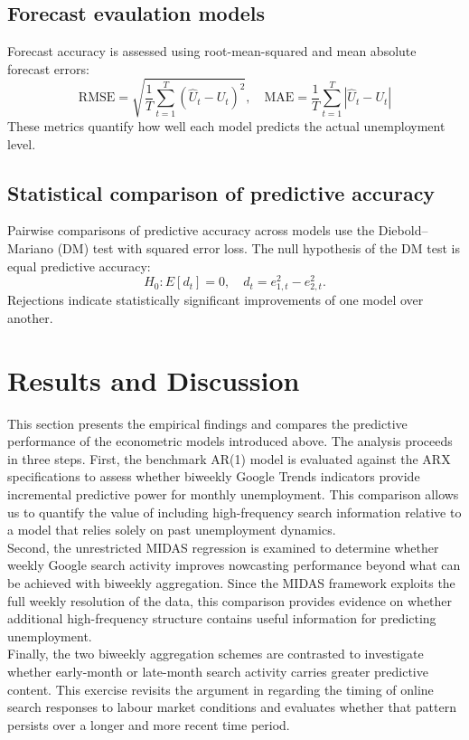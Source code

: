 \documentclass[12pt,a4paper]{article}
\begin{document}
\subsection{Forecast evaulation models}
Forecast accuracy is assessed using root-mean-squared and mean absolute forecast errors:
\begin{equation}
    \text{RMSE} = \sqrt{\frac{1}{T} \sum_{t=1}^{T} (\hat{U}_t - U_t)^2}, \quad 
    \text{MAE} = \frac{1}{T} \sum_{t=1}^{T} |\hat{U}_t - U_t|
\end{equation}
These metrics quantify how well each model predicts the actual unemployment level.
\subsection{Statistical comparison of predictive accuracy}
Pairwise comparisons of predictive accuracy across models use the Diebold–Mariano (DM) test with squared error loss. The null hypothesis of the DM test is equal predictive accuracy:
\begin{equation}
    H_0: E[d_t] = 0, \quad d_t = e_{1,t}^2 - e_{2,t}^2.
\end{equation}
Rejections indicate statistically significant improvements of one model over another.

\section{Results and Discussion}
This section presents the empirical findings and compares the predictive
performance of the econometric models introduced above. The analysis proceeds in
three steps. First, the benchmark AR(1) model is evaluated against the ARX
specifications to assess whether biweekly Google Trends indicators provide
incremental predictive power for monthly unemployment. This comparison allows us
to quantify the value of including high-frequency search information relative to
a model that relies solely on past unemployment dynamics.\\
Second, the unrestricted MIDAS regression is examined to determine whether weekly
Google search activity improves nowcasting performance beyond what can be
achieved with biweekly aggregation. Since the MIDAS framework exploits the full
weekly resolution of the data, this comparison provides evidence on whether
additional high-frequency structure contains useful information for predicting
unemployment.\\
Finally, the two biweekly aggregation schemes are contrasted to investigate
whether early-month or late-month search activity carries greater predictive
content. This exercise revisits the argument in \citet{Askitas} regarding the
timing of online search responses to labour market conditions and evaluates
whether that pattern persists over a longer and more recent time period.
\end{document}
